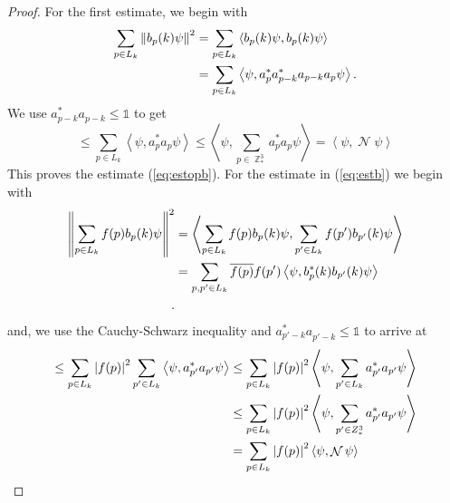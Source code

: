 \documentclass[sn-mathphys, Numbered ,a4paper]{sn-jnl}%
\DeclareMathOperator{\Z}{\mathbb{Z}}
\DeclareMathOperator{\NN}{\mathcal{N}}
\newcommand{\eva}[1]{\left\langle #1 \right\rangle}
\theoremstyle{plain}
\theoremstyle{definition}
\theoremstyle{remark}
\theoremstyle{plain}
\theoremstyle{definition}
\theoremstyle{remark}
\begin{document}
\begin{proof}
    For the first estimate, we begin with
    \begin{align}
         \sum\limits_{p \in L_k}\norm{b_p(k)\psi}^2 &= \sum\limits_{p \in L_k} \eva{b_p(k)\psi,b_p(k)\psi}\nonumber\\
        &= \sum\limits_{p \in L_k} \eva{\psi,a^*_{p} a^*_{p-k}a_{p-k} a_{p}\psi}.  
    \end{align}
    We use $a^*_{p-k}a_{p-k} \leq \mathds{1}$ to get 
    \begin{equation}
        \leq \sum\limits_{p \in L_k} \eva{\psi,a^*_{p} a_{p}\psi}
        \leq \eva{\psi,\sum\limits_{p \in \Z^3_*}a^*_{p} a_{p}\psi} = \eva{\psi, \NN\psi}
    \end{equation}
    This proves the estimate (\ref{eq:estopb}). For the estimate in (\ref{eq:estb}) we begin with
    \begin{align}
        \norm{\sum\limits_{p\in L_k}f(p)b_p(k)\psi}^2 &= \eva{\sum\limits_{p\in L_k}f(p)b_p(k)\psi,\sum\limits_{p'\in L_k}f(p')b_{p'}(k)\psi}\nonumber\\
        &= \sum\limits_{p,p' \in L_k} \overline{f(p)}f(p') \eva{\psi,b^*_p(k)b_{p'}(k)\psi} \nonumber\\.  
    \end{align}
    and, we use the Cauchy-Schwarz inequality and $a^*_{p'-k}a^{\phantom{*}}_{p'-k} \leq \mathds{1}$ to arrive at 
    \begin{align}
        \leq \sum\limits_{p \in L_k} \abs{f(p)}^2 \sum\limits_{p' \in L_k} \eva{\psi,a^*_{p'} a_{p'} \psi} &\leq \sum\limits_{p \in L_k} \abs{f(p)}^2 \eva{\psi, \sum\limits_{p' \in L_k} a^*_{p'} a_{p'} \psi}\nonumber\\
        &\leq \sum\limits_{p \in L_k} \abs{f(p)}^2 \eva{\psi, \sum\limits_{p' \in Z^3_*} a^*_{p'} a_{p'} \psi}\\
        &= \sum\limits_{p \in L_k} \abs{f(p)}^2 \eva{\psi, \NN \psi}
    \end{align}
    

\end{proof}
\end{document}
